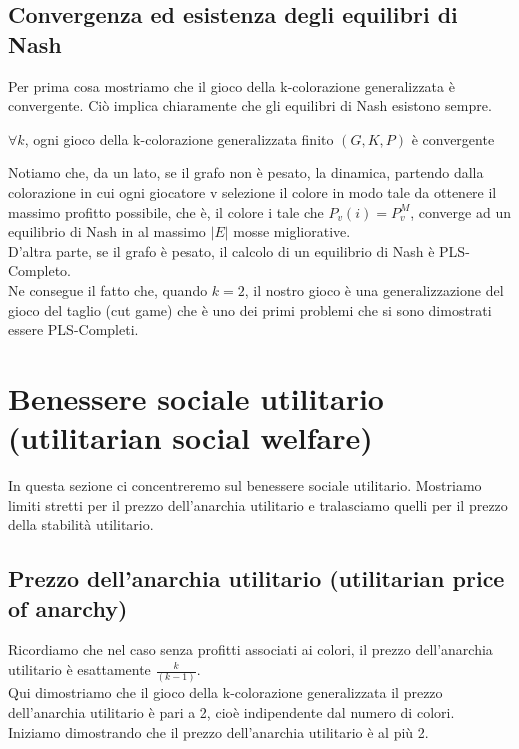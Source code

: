\subsection{Convergenza ed esistenza degli equilibri di Nash}
\justify
Per prima cosa mostriamo che il gioco della k-colorazione generalizzata è convergente. Ciò implica chiaramente che gli equilibri di Nash esistono sempre.\\

\begin{prop}
	\(\forall k\), ogni gioco della k-colorazione generalizzata finito \((G, K, P)\) è convergente
\end{prop}

Notiamo che, da un lato, se il grafo non è pesato, la dinamica, partendo dalla colorazione in cui ogni giocatore v selezione il colore in modo tale da ottenere il massimo profitto possibile, che è, il colore i tale che \(P_v (i) = P_v^M\), converge ad un equilibrio di Nash in al massimo \(|E|\) mosse migliorative.\\
D'altra parte, se il grafo è pesato, il calcolo di un equilibrio di Nash è PLS-Completo.\\
Ne consegue il fatto che, quando \(k = 2\), il nostro gioco è una generalizzazione del gioco del taglio (cut game) che è uno dei primi problemi che si sono dimostrati essere PLS-Completi.\newline

\section{Benessere sociale utilitario (utilitarian social welfare)}
\justify
In questa sezione ci concentreremo sul benessere sociale utilitario. Mostriamo limiti stretti per il prezzo dell'anarchia utilitario e tralasciamo quelli per il prezzo della stabilità utilitario.\newline

\subsection{Prezzo dell'anarchia utilitario (utilitarian price of anarchy)}
\justify
Ricordiamo che nel caso senza profitti associati ai colori, il prezzo dell'anarchia utilitario è esattamente \(\frac{k}{(k-1)}\).\\
Qui dimostriamo che il gioco della k-colorazione generalizzata il prezzo dell'anarchia utilitario è pari a 2, cioè indipendente dal numero di colori.\\
Iniziamo dimostrando che il prezzo dell'anarchia utilitario è al più 2.\\

